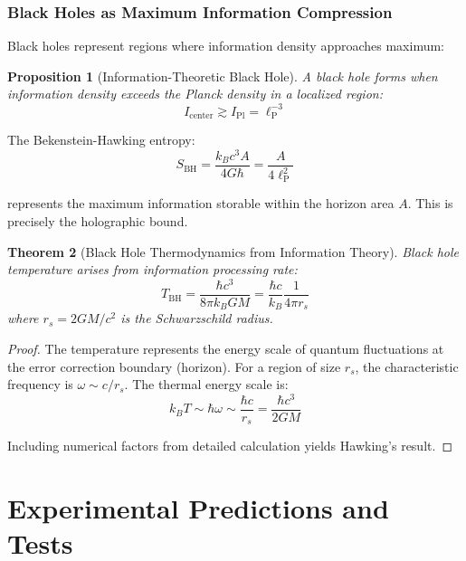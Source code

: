 \documentclass[12pt,a4paper]{article}
\newtheorem{theorem}{Theorem}[section]
\newtheorem{proposition}[theorem]{Proposition}
\theoremstyle{remark}
\newcommand{\lP}{\ell_{\text{P}}}
\begin{document}
\subsubsection{Black Holes as Maximum Information Compression}

Black holes represent regions where information density approaches maximum:

\begin{proposition}[Information-Theoretic Black Hole]
A black hole forms when information density exceeds the Planck density in a localized region:
\begin{equation}
I_{\text{center}} \gtrsim I_{\text{Pl}} = \lP^{-3}
\end{equation}
\end{proposition}

The Bekenstein-Hawking entropy:
\begin{equation}
S_{\text{BH}} = \frac{k_B c^3 A}{4G\hbar} = \frac{A}{4\lP^2}
\end{equation}

represents the maximum information storable within the horizon area $A$. This is precisely the holographic bound.

\begin{theorem}[Black Hole Thermodynamics from Information Theory]
Black hole temperature arises from information processing rate:
\begin{equation}
T_{\text{BH}} = \frac{\hbar c^3}{8\pi k_B G M} = \frac{\hbar c}{k_B}\frac{1}{4\pi r_s}
\end{equation}
where $r_s = 2GM/c^2$ is the Schwarzschild radius.
\end{theorem}

\begin{proof}
The temperature represents the energy scale of quantum fluctuations at the error correction boundary (horizon). For a region of size $r_s$, the characteristic frequency is $\omega \sim c/r_s$. The thermal energy scale is:
\begin{equation}
k_B T \sim \hbar\omega \sim \frac{\hbar c}{r_s} = \frac{\hbar c^3}{2GM}
\end{equation}

Including numerical factors from detailed calculation yields Hawking's result.
\end{proof}

\section{Experimental Predictions and Tests}
\label{sec:experimental}
\end{document}
